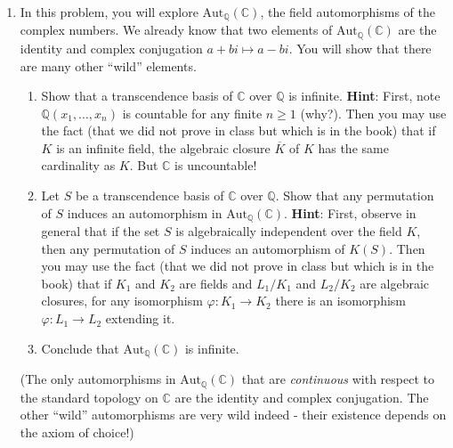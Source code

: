 \documentclass[11pt]{article}
\begin{document}
\begin{enumerate}
\item In this problem, you will explore $\mathrm{Aut}_{\mathbb{Q}}(\mathbb{C})$, the field automorphisms of the complex numbers. We already know that two elements of $\mathrm{Aut}_{\mathbb{Q}}(\mathbb{C})$ are the identity and complex conjugation $a+bi \mapsto a-bi$. You will show that there are many other ``wild'' elements.
\begin{enumerate}
\item Show that a transcendence basis of $\mathbb{C}$ over $\mathbb{Q}$ is infinite. {\bf Hint}: First, note $\mathbb{Q}(x_1,\ldots,x_n)$ is countable for any finite $n \geq 1$ (why?). Then you may use the fact (that we did not prove in class but which is in the book) that if $K$ is an infinite field, the algebraic closure $\overline{K}$ of $K$ has the same cardinality as $K$. But $\mathbb{C}$ is uncountable!
\item Let $S$ be a transcendence basis of $\mathbb{C}$ over $\mathbb{Q}$. Show that any permutation of $S$ induces an automorphism in $\mathrm{Aut}_{\mathbb{Q}}(\mathbb{C})$. {\bf Hint}: First, observe in general that if the set $S$ is algebraically independent over the field $K$, then any permutation of $S$ induces an automorphism of $K(S)$. Then you may use the fact (that we did not prove in class but which is in the book) that if $K_1$ and $K_2$ are fields and $L_1/K_1$ and $L_2/K_2$ are algebraic closures, for any isomorphism $\varphi\colon K_1 \to K_2$ there is an isomorphism $\varphi \colon L_1 \to L_2$ extending it.
\item Conclude that $\mathrm{Aut}_{\mathbb{Q}}(\mathbb{C})$ is infinite.
\end{enumerate}
(The only automorphisms in $\mathrm{Aut}_{\mathbb{Q}}(\mathbb{C})$ that are \emph{continuous} with respect to the standard topology on $\mathbb{C}$ are the identity and complex conjugation. The other ``wild'' automorphisms are very wild indeed - their existence depends on the axiom of choice!)

\end{enumerate}
\end{document}
